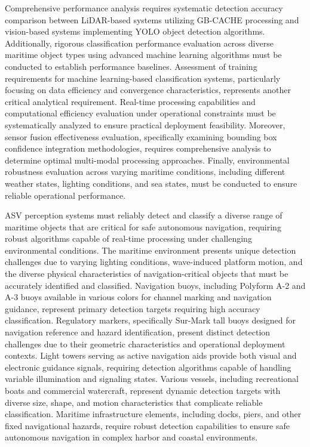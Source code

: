 \documentclass{erauthesis}
\begin{document}
Comprehensive performance analysis requires systematic detection accuracy comparison between \ac{LiDAR}-based systems utilizing \ac{GB-CACHE} processing and vision-based systems implementing \ac{YOLO} object detection algorithms. Additionally, rigorous classification performance evaluation across diverse maritime object types using advanced machine learning algorithms must be conducted to establish performance baselines. Assessment of training requirements for machine learning-based classification systems, particularly focusing on data efficiency and convergence characteristics, represents another critical analytical requirement. Real-time processing capabilities and computational efficiency evaluation under operational constraints must be systematically analyzed to ensure practical deployment feasibility. Moreover, sensor fusion effectiveness evaluation, specifically examining bounding box confidence integration methodologies, requires comprehensive analysis to determine optimal multi-modal processing approaches. Finally, environmental robustness evaluation across varying maritime conditions, including different weather states, lighting conditions, and sea states, must be conducted to ensure reliable operational performance.

\ac{ASV} perception systems must reliably detect and classify a diverse range of maritime objects that are critical for safe autonomous navigation, requiring robust algorithms capable of real-time processing under challenging environmental conditions. The maritime environment presents unique detection challenges due to varying lighting conditions, wave-induced platform motion, and the diverse physical characteristics of navigation-critical objects that must be accurately identified and classified. Navigation buoys, including Polyform A-2 and A-3 buoys available in various colors for channel marking and navigation guidance, represent primary detection targets requiring high accuracy classification. Regulatory markers, specifically Sur-Mark tall buoys designed for navigation reference and hazard identification, present distinct detection challenges due to their geometric characteristics and operational deployment contexts. Light towers serving as active navigation aids provide both visual and electronic guidance signals, requiring detection algorithms capable of handling variable illumination and signaling states. Various vessels, including recreational boats and commercial watercraft, represent dynamic detection targets with diverse size, shape, and motion characteristics that complicate reliable classification. Maritime infrastructure elements, including docks, piers, and other fixed navigational hazards, require robust detection capabilities to ensure safe autonomous navigation in complex harbor and coastal environments.
\end{document}
